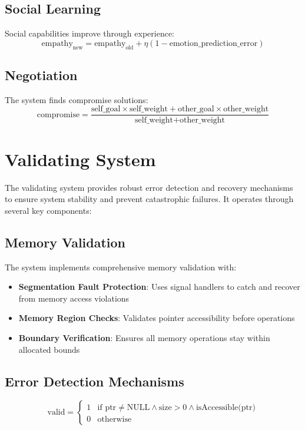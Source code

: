 \documentclass{article}
\begin{document}
\subsection{Social Learning}
Social capabilities improve through experience:
\[
\text{empathy}_{\text{new}} = \text{empathy}_{\text{old}} + \eta(1 - \text{emotion\_prediction\_error})
\]

\subsection{Negotiation}
The system finds compromise solutions:
\[
\text{compromise} = \frac{\text{self\_goal} \times \text{self\_weight} + \text{other\_goal} \times \text{other\_weight}}{\text{self\_weight} + \text{other\_weight}}
\]

\section{Validating System}
The validating system provides robust error detection and recovery mechanisms to ensure system stability and prevent catastrophic failures. It operates through several key components:

\subsection{Memory Validation}
The system implements comprehensive memory validation with:
\begin{itemize}[leftmargin=*]
\item \textbf{Segmentation Fault Protection}: Uses signal handlers to catch and recover from memory access violations
\item \textbf{Memory Region Checks}: Validates pointer accessibility before operations
\item \textbf{Boundary Verification}: Ensures all memory operations stay within allocated bounds
\end{itemize}

\subsection{Error Detection Mechanisms}
\begin{equation}
\text{valid} = \begin{cases}
1 & \text{if } \text{ptr} \neq \text{NULL} \land \text{size} > 0 \land \text{isAccessible(ptr)} \\
0 & \text{otherwise}
\end{cases}
\end{equation}
\end{document}
